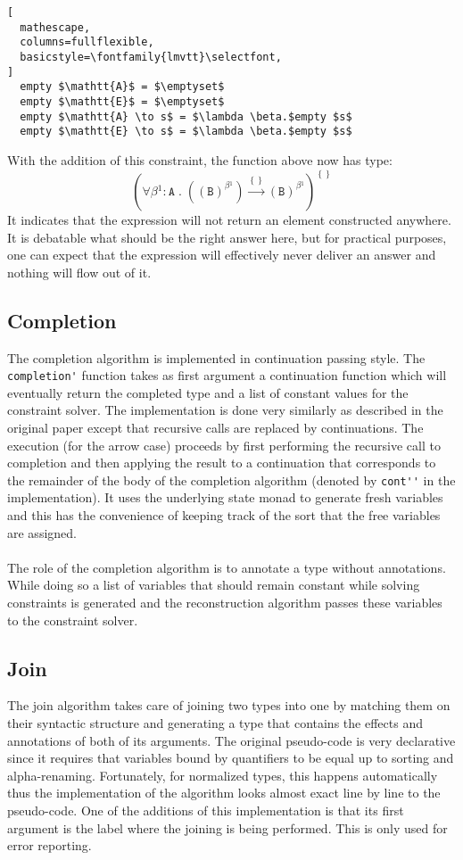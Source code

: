 \documentclass[8pt]{extarticle}
\begin{document}
\begin{lstlisting}[
  mathescape,
  columns=fullflexible,
  basicstyle=\fontfamily{lmvtt}\selectfont,
]
  empty $\mathtt{A}$ = $\emptyset$
  empty $\mathtt{E}$ = $\emptyset$
  empty $\mathtt{A} \to s$ = $\lambda \beta.$empty $s$
  empty $\mathtt{E} \to s$ = $\lambda \beta.$empty $s$
\end{lstlisting}
With the addition of this constraint, the function above now has type:
\[
\left(\forall{}\beta{}^{1}:\mathtt{A}\;{}.\;{}\left(\left(\mathtt{B}\right)^{\beta{}^{1}}\right)\xrightarrow{\left\{\right\}}\left(\mathtt{B}\right)^{\beta{}^{1}}\right)^{\left\{\right\}}
\]
It indicates that the expression will not return an element constructed anywhere. It is debatable what should be the right answer here, but for practical purposes, one can expect that the expression will effectively never deliver an answer and nothing will flow out of it.
\subsection{Completion}
The completion algorithm is implemented in continuation passing style. The \verb+completion'+ function takes as first argument a continuation function which will eventually return the completed type and a list of constant values for the constraint solver. The implementation is done very similarly as described in the original paper except that recursive calls are replaced by continuations. The execution (for the arrow case) proceeds by first performing the recursive call to completion and then applying the result to a continuation that corresponds to the remainder of the body of the completion algorithm (denoted by \verb+cont''+ in the implementation). It uses the underlying state monad to generate fresh variables and this has the convenience of keeping track of the sort that the free variables are assigned.
\\\\
The role of the completion algorithm is to annotate a type without annotations. While doing so a list of variables that should remain constant while solving constraints is generated and the reconstruction algorithm passes these variables to the constraint solver.
\subsection{Join}
The join algorithm takes care of joining two types into one by matching them on their syntactic structure and generating a type that contains the effects and annotations of both of its arguments. The original pseudo-code is very declarative since it requires that variables bound by quantifiers to be equal up to sorting and alpha-renaming. Fortunately, for normalized types, this happens automatically thus the implementation of the algorithm looks almost exact line by line to the pseudo-code. One of the additions of this implementation is that its first argument is the label where the joining is being performed. This is only used for error reporting.
\end{document}
